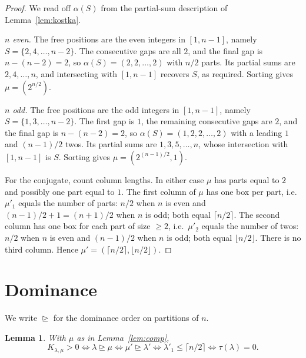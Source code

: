 \documentclass[11pt]{article}
\newtheorem{lemma}{Lemma}
\theoremstyle{remark}
\begin{document}
\begin{proof}
We read off $\alpha(S)$ from the partial-sum description of Lemma~\ref{lem:kostka}.

\emph{$n$ even.} The free positions are the even integers in $[1,n-1]$, namely $S=\{2,4,\dots,n-2\}$. The consecutive gaps are all $2$, and the final gap is $n-(n-2)=2$, so $\alpha(S)=(2,2,\dots,2)$ with $n/2$ parts. Its partial sums are $2,4,\dots,n$, and intersecting with $[1,n-1]$ recovers $S$, as required. Sorting gives $\mu=(2^{n/2})$.

\emph{$n$ odd.} The free positions are the odd integers in $[1,n-1]$, namely $S=\{1,3,\dots,n-2\}$. The first gap is $1$, the remaining consecutive gaps are $2$, and the final gap is $n-(n-2)=2$, so $\alpha(S)=(1,2,2,\dots,2)$ with a leading $1$ and $(n-1)/2$ twos. Its partial sums are $1,3,5,\dots,n$, whose intersection with $[1,n-1]$ is $S$. Sorting gives $\mu=(2^{(n-1)/2},1)$.

For the conjugate, count column lengths. In either case $\mu$ has parts equal to $2$ and possibly one part equal to $1$. The first column of $\mu$ has one box per part, i.e.\ $\mu'_1$ equals the number of parts: $n/2$ when $n$ is even and $(n-1)/2+1=(n+1)/2$ when $n$ is odd; both equal $\lceil n/2\rceil$. The second column has one box for each part of size $\ge 2$, i.e.\ $\mu'_2$ equals the number of twos: $n/2$ when $n$ is even and $(n-1)/2$ when $n$ is odd; both equal $\lfloor n/2\rfloor$. There is no third column. Hence $\mu'=(\lceil n/2\rceil,\lfloor n/2\rfloor)$.
\end{proof}

\section{Dominance}

We write $\trianglerighteq$ for the dominance order on partitions of $n$.

\begin{lemma}\label{lem:dom}
With $\mu$ as in Lemma~\ref{lem:comp},
\[
K_{\lambda,\mu}>0 \iff \lambda\trianglerighteq\mu \iff \mu'\trianglerighteq\lambda'
\iff \lambda'_1\le\lceil n/2\rceil \iff \tau(\lambda)=0.
\]
\end{lemma}
\end{document}
